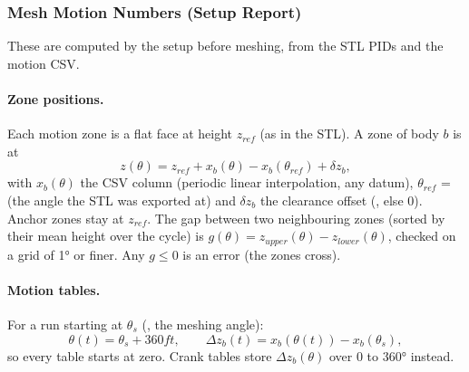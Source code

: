 \subsubsection{Mesh Motion Numbers (Setup Report)}
These are computed by the setup before meshing, from the STL PIDs and the motion CSV.

\paragraph{Zone positions.}
Each motion zone is a flat face at height $z_{ref}$ (as in the STL). A zone of body $b$ is at
\begin{equation}
z(\theta) = z_{ref} + x_b(\theta) - x_b(\theta_{ref}) + \delta z_b ,
\end{equation}
with $x_b(\theta)$ the CSV column (periodic linear interpolation, any datum), $\theta_{ref}$ =  (the angle the STL was exported at) and $\delta z_b$ the clearance offset (, else 0). Anchor zones stay at $z_{ref}$. The gap between two neighbouring zones (sorted by their mean height over the cycle) is $g(\theta) = z_{upper}(\theta) - z_{lower}(\theta)$, checked on a grid of 1° or finer. Any $g \le 0$ is an error (the zones cross).

\paragraph{Motion tables.}
For a run starting at $\theta_s$ (, the meshing angle):
\begin{equation}
\theta(t) = \theta_s + 360 f t, \qquad \Delta z_b(t) = x_b(\theta(t)) - x_b(\theta_s) ,
\end{equation}
so every table starts at zero. Crank tables store $\Delta z_b(\theta)$ over 0 to 360° instead.


